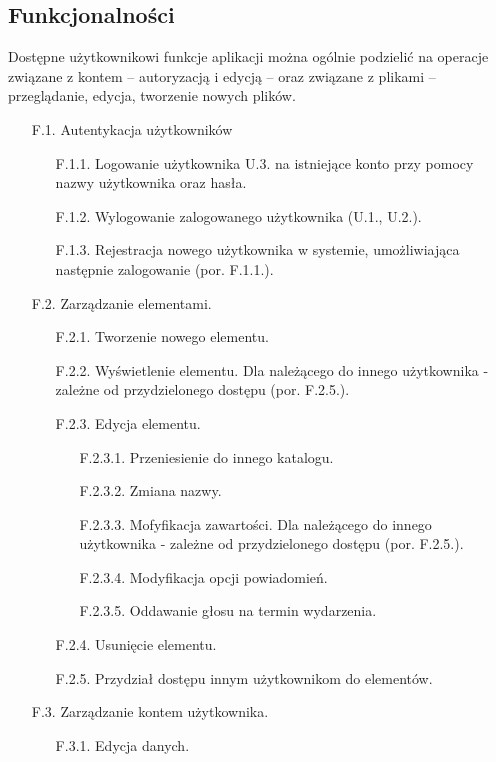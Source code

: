 \documentclass[a4paper,twoside,12pt]{book}
\newcommand{\ksremark}[1]{%
{%
{\color{brickred}{[#1]}}}%
\addcontentsline{rks}{uwagas}{\protect{#1}}%
}
\begin{document}
\subsection{Funkcjonalności}
\ksremark{słowo zagajenia}
Dostępne użytkownikowi funkcje aplikacji można ogólnie podzielić na operacje związane z kontem -- autoryzacją i edycją -- oraz związane z plikami -- przeglądanie, edycja, tworzenie nowych plików.
\begin{itemize}
	\item [F.1.] Autentykacja użytkowników
	\begin{itemize}
		\item [F.1.1.] Logowanie użytkownika U.3. na istniejące konto przy pomocy nazwy użytkownika oraz hasła.
		\item [F.1.2.] Wylogowanie zalogowanego użytkownika (U.1., U.2.).
		\item [F.1.3.] Rejestracja nowego użytkownika w systemie, umożliwiająca następnie zalogowanie (por. F.1.1.).
	\end{itemize}
	\item [F.2.] Zarządzanie elementami.
	\begin{itemize}
		\item [F.2.1.] Tworzenie nowego elementu.
		\item [F.2.2.] Wyświetlenie elementu. Dla należącego do innego użytkownika - zależne od przydzielonego dostępu (por. F.2.5.).
		\item [F.2.3.] Edycja elementu.
		\begin{itemize}
			\item [F.2.3.1.] Przeniesienie do innego katalogu.
			\item [F.2.3.2.] Zmiana nazwy.
			\item [F.2.3.3.] Mofyfikacja zawartości. Dla należącego do innego użytkownika - zależne od przydzielonego dostępu (por. F.2.5.).
			\item [F.2.3.4.] Modyfikacja opcji powiadomień.
			\item [F.2.3.5.] Oddawanie głosu na termin wydarzenia.
		\end{itemize}
		\item [F.2.4.] Usunięcie elementu.
		\item [F.2.5.] Przydział dostępu innym użytkownikom do elementów.
	\end{itemize}
	\item [F.3.] Zarządzanie kontem użytkownika.
	\begin{itemize}
		\item [F.3.1.] Edycja danych.

\end{itemize}
\end{itemize}
\end{document}
